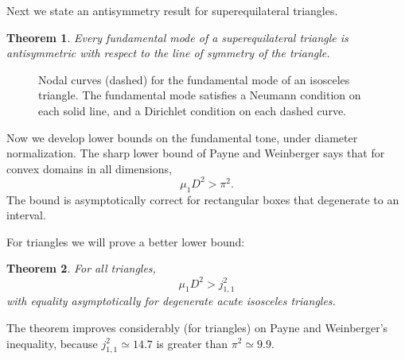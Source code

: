 \documentclass[11pt,reqno]{amsart}
\newtheorem{theorem}{Theorem}[section]
\numberwithin{equation}{section}
\begin{document}
Next we state an antisymmetry result for superequilateral triangles.
\begin{theorem} \label{bluntantisymmetric} Every fundamental mode of a superequilateral triangle is
antisymmetric with respect to the line of symmetry of the triangle.
\end{theorem}
\begin{figure}[t]
  \begin{center}
    \hspace*{\fill}
    \hspace*{\fill}
    \hspace*{\fill}
  \end{center}
  \caption{Nodal curves (dashed) for the fundamental mode of an isosceles triangle. The fundamental mode satisfies a Neumann condition on each solid line, and a Dirichlet condition on each dashed curve.} \label{symmfig}
\end{figure}

\medskip Now we develop lower bounds on the fundamental tone, under diameter normalization.
The sharp lower bound of Payne and Weinberger \cite{PW60} says that for
convex domains in all dimensions,
\begin{equation} \label{PW}
  \mu_1 D^2>\pi^2.
\end{equation}
The bound is asymptotically correct for rectangular boxes that
degenerate to an interval. 

For triangles we will prove a better lower bound:
\begin{theorem} \label{th:tld2}
For all triangles,
\[
    \mu_1 D^2 > j_{1,1}^2
\]
with equality asymptotically for degenerate acute isosceles
triangles.
\end{theorem}
The theorem improves considerably (for triangles) on Payne and
Weinberger's inequality, because $j_{1,1}^2 \simeq 14.7$ is
greater than $\pi^2 \simeq 9.9$.
\end{document}
